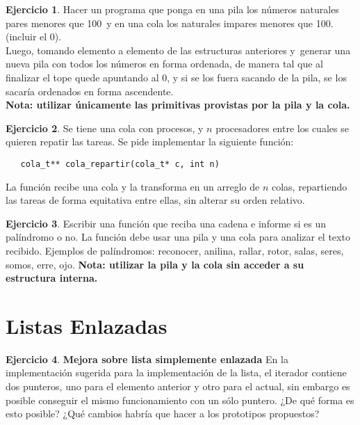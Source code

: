 \documentclass[11pt,a4paper]{article}
\theoremstyle{definition}
\newtheorem{ejercicio}{Ejercicio}[section]
\begin{document}
\begin{ejercicio}
Hacer un programa que ponga en una pila los números naturales pares menores
que 100 y en una cola los naturales impares menores que 100. (incluir el 0). \\
Luego, tomando elemento a elemento de las estructuras anteriores y generar una
nueva pila con todos los números en forma ordenada, de manera tal que al
finalizar el tope quede apuntando al 0, y si se los fuera sacando de la
pila, se los sacaría ordenados en forma ascendente. \\
\bf{Nota}: utilizar únicamente las primitivas provistas por la pila y la
cola.
\end{ejercicio}

\begin{ejercicio}
Se tiene una cola con procesos, y $n$ procesadores entre los cuales se
quieren repatir las tareas. Se pide implementar la siguiente función:
\begin{lstlisting}
   cola_t** cola_repartir(cola_t* c, int n)
\end{lstlisting}
La función recibe una cola y la transforma en un arreglo de $n$ colas,
repartiendo las tareas de forma equitativa entre ellas, sin alterar su
orden relativo.
\end{ejercicio}

\begin{ejercicio}
Escribir una función que reciba una cadena e informe si es un palíndromo o
no. La función debe usar una pila y una cola para analizar el texto
recibido. Ejemplos de palíndromos: reconocer, anilina, rallar, rotor,
salas, seres, somos, erre, ojo.
\bf{Nota}: utilizar la pila y la cola sin acceder a su estructura interna.
\end{ejercicio}


\newpage
\section{Listas Enlazadas}

\begin{ejercicio}
\textbf{Mejora sobre lista simplemente enlazada} En la implementación
sugerida para la implementación de la lista, el iterador contiene dos
punteros, uno para el elemento anterior y otro para el actual, sin embargo
es posible conseguir el mismo funcionamiento con un sólo puntero. ¿De qué
forma es esto posible? ¿Qué cambios habría que hacer a los prototipos
propuestos?
\end{ejercicio}
\end{document}

